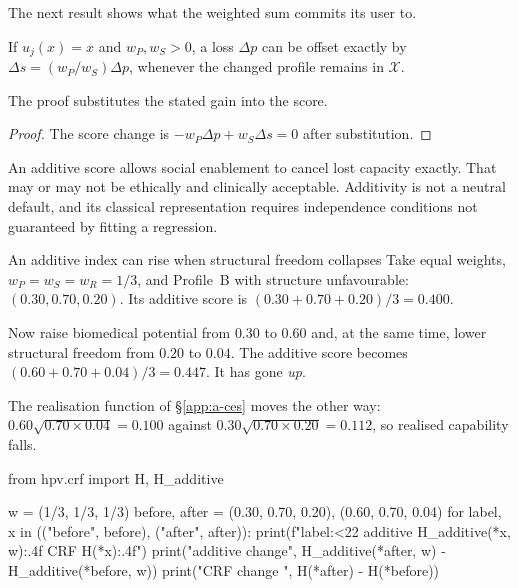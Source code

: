 The next result shows what the weighted sum commits its user to.

\begin{proposition}[Compensation]
If $u_j(x)=x$ and $w_P,w_S>0$, a loss $\Delta p$ can be offset exactly by
$\Delta s=(w_P/w_S)\Delta p$, whenever the changed profile remains in
$\mathcal X$.
\end{proposition}
The proof substitutes the stated gain into the score.
\begin{proof}
The score change is $-w_P\Delta p+w_S\Delta s=0$ after substitution.
\end{proof}

\begin{remark}
An additive score allows social enablement to cancel lost capacity exactly.
That may or may not be ethically and clinically acceptable. Additivity is not
a neutral default, and its classical representation requires independence
conditions not guaranteed by fitting a regression. \citep{keeney_raiffa_1976}
\end{remark}

\begin{workedexample}{An additive index can rise when structural freedom collapses}
Take equal weights, $w_P=w_S=w_R=1/3$, and Profile~B with structure
unfavourable: $(0.30,0.70,0.20)$. Its additive score is
$(0.30+0.70+0.20)/3=0.400$.

Now raise biomedical potential from $0.30$ to $0.60$ and, at the same time,
lower structural freedom from $0.20$ to $0.04$. The additive score becomes
$(0.60+0.70+0.04)/3=0.447$. It has gone \emph{up}.

The realisation function of \S\ref{app:a-ces} moves the other way:
$0.60\sqrt{0.70\times0.04}=0.100$ against $0.30\sqrt{0.70\times0.20}=0.112$, so
realised capability falls.

\begin{wecode}[Python]
from hpv.crf import H, H_additive

w = (1/3, 1/3, 1/3)
before, after = (0.30, 0.70, 0.20), (0.60, 0.70, 0.04)
for label, x in (("before", before), ("after", after)):
    print(f"{label:<22} additive {H_additive(*x, w):.4f}   CRF {H(*x):.4f}")
print("additive change", H_additive(*after, w) - H_additive(*before, w))
print("CRF change     ", H(*after) - H(*before))
\end{wecode}

\end{workedexample}

